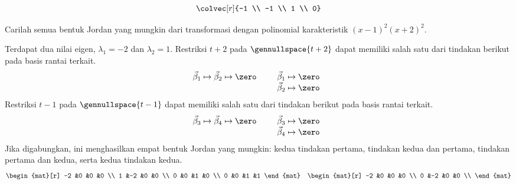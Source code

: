 \begin{exercises}
\begin{answer}
\begin{exparts}
\begin{equation*}
{                          \colvec[r]{-1 \\ -1 \\ 1 \\ 0}}
            \end{equation*}
      \end{exparts}  
    \end{answer}
  \recommended \item
    Carilah semua bentuk Jordan yang mungkin dari transformasi dengan polinomial
    karakteristik \( (x-1)^2(x+2)^2 \).
    \begin{answer}
      Terdapat dua nilai eigen, $\lambda_1=-2$ dan $\lambda_2=1$.
      Restriksi $t+2$ pada
      $\gennullspace{t+2}$ dapat memiliki salah satu dari tindakan berikut
      pada basis rantai terkait.
      \begin{equation*}
        \vec{\beta}_1\mapsto\vec{\beta}_2\mapsto\zero
        \qquad
        \begin{array}[t]{l}
          \vec{\beta}_1\mapsto\zero  \\
          \vec{\beta}_2\mapsto\zero 
        \end{array}
      \end{equation*}
      Restriksi $t-1$ pada
      $\gennullspace{t-1}$ dapat memiliki salah satu dari tindakan berikut
      pada basis rantai terkait.
      \begin{equation*}
        \vec{\beta}_3\mapsto\vec{\beta}_4\mapsto\zero
        \qquad
        \begin{array}[t]{l}
          \vec{\beta}_3\mapsto\zero  \\
          \vec{\beta}_4\mapsto\zero 
        \end{array}
      \end{equation*}
      Jika digabungkan, ini menghasilkan empat bentuk Jordan yang mungkin:
      kedua tindakan pertama, tindakan kedua dan pertama, tindakan pertama dan kedua,
      serta kedua tindakan kedua.
      \begin{equation*}
        \begin{mat}[r]
          -2  &0  &0  &0  \\
           1  &-2 &0  &0  \\
           0  &0  &1  &0  \\
           0  &0  &1  &1
        \end{mat}
        \quad
        \begin{mat}[r]
          -2  &0  &0  &0  \\
           0  &-2 &0  &0  \\

\end{mat}
\end{equation*}
\end{answer}
\end{exercises}
